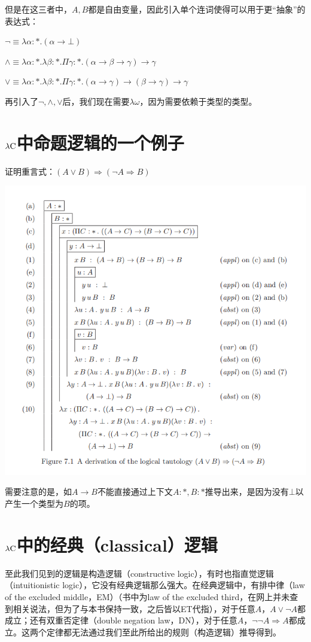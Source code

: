 \documentclass[UTF8]{article}
\begin{document}
		但是在这三者中，$A,B$都是自由变量，因此引入单个连词使得可以用于更“抽象”的表达式：
		
		$\neg\equiv\lambda\alpha:*.(\alpha\rightarrow\bot)$
		
		$\land\equiv\lambda\alpha:*.\lambda\beta:*.\Pi\gamma:*.(\alpha\rightarrow\beta\rightarrow\gamma)\rightarrow\gamma$
		
		$\lor\equiv\lambda\alpha:*.\lambda\beta:*.\Pi\gamma:*.(\alpha\rightarrow\gamma)\rightarrow(\beta\rightarrow\gamma)\rightarrow\gamma$
		
		再引入了$\neg,\land,\lor$后，我们现在需要$\lambda{\omega}$，因为需要依赖于类型的类型。
	
	\section{$\lambda{\rm C}$中命题逻辑的一个例子}
	\noindent
	证明重言式：$(A\lor B)\Rightarrow(\neg A\Rightarrow B)$
	
		\noindent
		\includegraphics[width=0.93\linewidth]{"../imgs/7-1.png"}
	
		需要注意的是，如$A\rightarrow B$不能直接通过上下文$A:*,B:*$推导出来，是因为没有$\bot$以产生一个类型为$B$的项。
	
	\section{$\lambda{\rm C}$中的经典（classical）逻辑}
	\noindent
	至此我们见到的逻辑是构造逻辑（constructive logic），有时也指直觉逻辑（intuitionistic logic），它没有经典逻辑那么强大。在经典逻辑中，有排中律（law of the excluded middle，EM）（书中为law of the excluded third，在网上并未查到相关说法，但为了与本书保持一致，之后皆以ET代指），对于任意$A$，$A\lor\neg A$都成立；还有双重否定律（double  negation law，DN），对于任意$A$，$\neg\neg A\Rightarrow A$都成立。这两个定律都无法通过我们至此所给出的规则（构造逻辑）推导得到。
	
\end{document}
